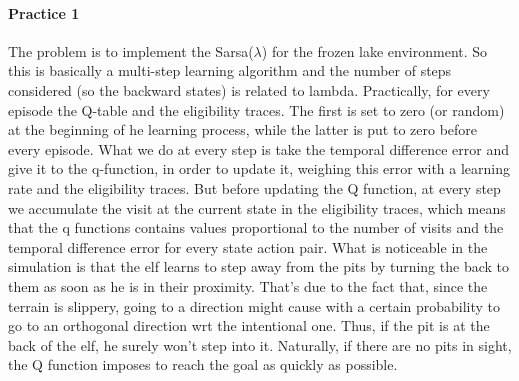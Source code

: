 \documentclass[12pt,a4paper]{extarticle}
\begin{document}
\paragraph{Practice 1}
The problem is to implement the Sarsa($\lambda$) for the frozen lake environment. So this is basically a multi-step learning algorithm and the number of steps considered (so the backward states) is related to lambda. Practically, for every episode the Q-table and the eligibility traces. The first is set to zero (or random) at the beginning of he learning process, while the latter is put to zero before every episode. What we do at every step is take the temporal difference error and give it to the q-function, in order to update it, weighing this error with a learning rate and the eligibility traces. But before updating the Q function, at every step we accumulate the visit at the current state in the eligibility traces, which means that the q functions contains values proportional to the number of visits and the temporal difference error for every state action pair. What is noticeable in the simulation is that the elf learns to step away from the pits by turning the back to them as soon as he is in their proximity. That's due to the fact that, since the terrain is slippery, going to a direction might cause with a certain probability to go to an orthogonal direction wrt the intentional one. Thus, if the pit is at the back of the elf, he surely won't step into it. Naturally, if there are no pits in sight, the Q function imposes to reach the goal as quickly as possible.
\end{document}
